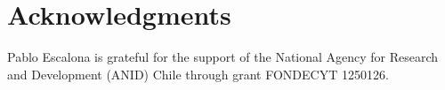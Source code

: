 \documentclass[preprint,11pt]{elsarticle}
\begin{document}
\section*{Acknowledgments}
Pablo Escalona is grateful for the support of the National Agency for Research and Development (ANID) Chile through grant FONDECYT 1250126.

\appendix

 

\end{document}
